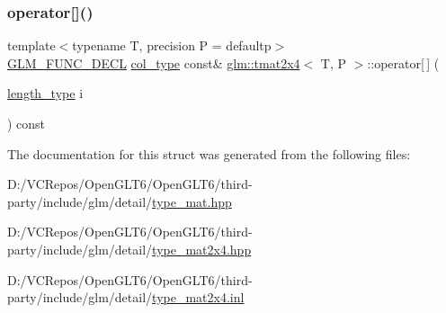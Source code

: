 \mbox{\label{structglm_1_1tmat2x4_a67d9d9d46fd65a05c4752da243faea64}} 
\subsubsection{\texorpdfstring{operator[]()}{operator[]()}\hspace{0.1cm}{\footnotesize\ttfamily [2/2]}}
{\footnotesize\ttfamily template$<$typename T, precision P = defaultp$>$ \\
\mbox{\hyperlink{setup_8hpp_ab2d052de21a70539923e9bcbf6e83a51}{G\+L\+M\+\_\+\+F\+U\+N\+C\+\_\+\+D\+E\+CL}} \mbox{\hyperlink{structglm_1_1tmat2x4_a9effcccd2c4c50c385e4c3a2fe2feedb}{col\+\_\+type}} const\& \mbox{\hyperlink{structglm_1_1tmat2x4}{glm\+::tmat2x4}}$<$ T, P $>$\+::operator\mbox{[}$\,$\mbox{]} (\begin{DoxyParamCaption}\item[{\mbox{\hyperlink{structglm_1_1tmat2x4_a8d8156b982138c22047082ca7a8f9009}{length\+\_\+type}}}]{i }\end{DoxyParamCaption}) const}



The documentation for this struct was generated from the following files\+:\begin{DoxyCompactItemize}
\item 
D\+:/\+V\+C\+Repos/\+Open\+G\+L\+T6/\+Open\+G\+L\+T6/third-\/party/include/glm/detail/\mbox{\hyperlink{type__mat_8hpp}{type\+\_\+mat.\+hpp}}\item 
D\+:/\+V\+C\+Repos/\+Open\+G\+L\+T6/\+Open\+G\+L\+T6/third-\/party/include/glm/detail/\mbox{\hyperlink{type__mat2x4_8hpp}{type\+\_\+mat2x4.\+hpp}}\item 
D\+:/\+V\+C\+Repos/\+Open\+G\+L\+T6/\+Open\+G\+L\+T6/third-\/party/include/glm/detail/\mbox{\hyperlink{type__mat2x4_8inl}{type\+\_\+mat2x4.\+inl}}\end{DoxyCompactItemize}
